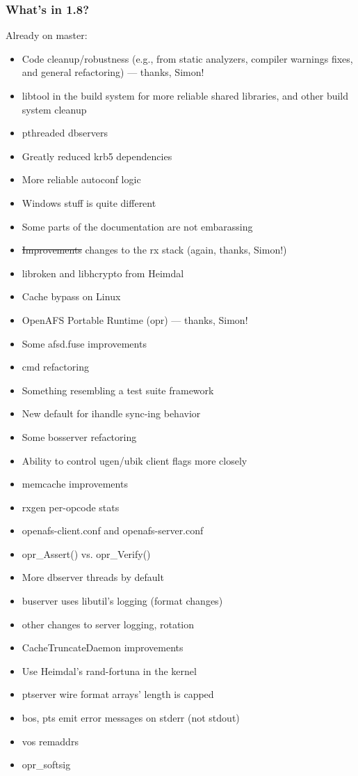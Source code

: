 \documentclass{beamer}
\begin{document}
\begin{frame}
\frametitle{What's in 1.8?}
Already on master:
\begin{itemize}
\item{Code cleanup/robustness (e.g., from static analyzers, compiler
warnings fixes, and general refactoring) --- thanks, Simon!}
\item{libtool in the build system for more reliable shared libraries,
and other build system cleanup}
\item{pthreaded dbservers}
\item{Greatly reduced krb5 dependencies}
\item{More reliable autoconf logic}
\item{Windows stuff is quite different}
\item{Some parts of the documentation are not embarassing}
\item{\sout{Improvements} changes to the rx stack (again, thanks, Simon!)}
\item{libroken and libhcrypto from Heimdal}
\item{Cache bypass on Linux}
\item{OpenAFS Portable Runtime (opr) --- thanks, Simon!}
\item{Some afsd.fuse improvements}
\item{cmd refactoring}
\item{Something resembling a test suite framework}
\item{New default for ihandle sync-ing behavior}
\item{Some bosserver refactoring}
\item{Ability to control ugen/ubik client flags more closely}
\item{memcache improvements}
\item{rxgen per-opcode stats}
\item{openafs-client.conf and openafs-server.conf}
\item{opr\_Assert() vs. opr\_Verify()}
\item{More dbserver threads by default}
\item{buserver uses libutil's logging (format changes)}
\item{other changes to server logging, rotation}
\item{CacheTruncateDaemon improvements}
\item{Use Heimdal's rand-fortuna in the kernel}
\item{ptserver wire format arrays' length is capped}
\item{bos, pts emit error messages on stderr (not stdout)}
\item{vos remaddrs}
\item{opr\_softsig}
\end{itemize}
\end{frame}
\end{document}
